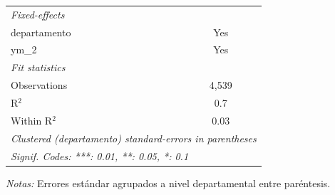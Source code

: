\documentclass[12pt]{article}
\begin{document}
\begin{table}[htbp]
\begin{threeparttable}
\begin{tabular}{lc}
      \midrule
      \emph{Fixed-effects}\\
      departamento                                                                    & Yes\\  
      ym\_2                                                                           & Yes\\  
      \midrule
      \emph{Fit statistics}\\
      Observations                                                                    & 4,539\\  
      R$^2$                                                                           & 0.7\\  
      Within R$^2$                                                                    & 0.03\\  
      \midrule \midrule
      \multicolumn{2}{l}{\emph{Clustered (departamento) standard-errors in parentheses}}\\
      \multicolumn{2}{l}{\emph{Signif. Codes: ***: 0.01, **: 0.05, *: 0.1}}\\
   \end{tabular}


\begin{tablenotes}
\footnotesize
\item \textit{Notas:} Errores estándar agrupados a nivel departamental entre paréntesis.
\end{tablenotes}
\end{threeparttable}
\end{table}
\end{document}
